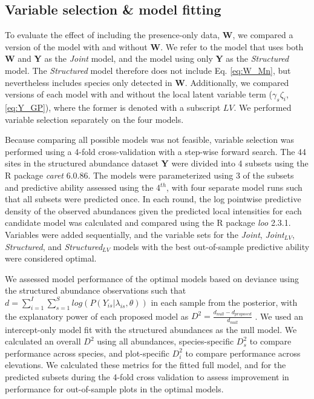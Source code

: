 \documentclass[preprint,review,times,12pt]{elsarticle}
\begin{document}
\subsection{Variable selection \& model fitting}
To evaluate the effect of including the presence-only data, \textbf{W}, we compared a version of the model with and without \textbf{W}. We refer to the model that uses both \textbf{W} and \textbf{Y} as the \emph{Joint} model, and the model using only \textbf{Y} as the \emph{Structured} model. The \emph{Structured} model therefore does not include Eq. \ref{eq:W_Mn}, but nevertheless includes species only detected in \textbf{W}. Additionally, we compared versions of each model with and without the local latent variable term ($\gamma_s \zeta_i$, \ref{eq:Y_GP}), where the former is denoted with a subscript $LV$. We performed variable selection separately on the four models.

Because comparing all possible models was not feasible, variable selection was performed using a 4-fold cross-validation with a step-wise forward search. The 44 sites in the structured abundance dataset \textbf{Y} were divided into 4 subsets using the R package \emph{caret} 6.0.86. The models were parameterized using 3 of the subsets and predictive ability assessed using the 4$^{th}$, with four separate model runs such that all subsets were predicted once. In each round, the log pointwise predictive density of the observed abundances given the predicted local intensities for each candidate model was calculated and compared using the R package \emph{loo} 2.3.1. Variables were added sequentially, and the variable sets for the \emph{Joint}, \emph{Joint}$_{LV}$, \emph{Structured}, and \emph{Structured}$_{LV}$ models with the best out-of-sample predictive ability were considered optimal.

We assessed model performance of the optimal models based on deviance using the structured abundance observations such that $d = \sum_{i=1}^{I}\sum_{s=1}^S log(P(Y_{is} | \lambda_{is}, \theta))$ in each sample from the posterior, with the explanatory power of each proposed model as $D^2 = \frac{d_{null} - d_{proposed}}{d_{null}}$ \citep{Guisan2000,Caradima2019}. We used an intercept-only model fit with the structured abundances as the null model. We calculated an overall $D^2$ using all abundances, species-specific $D^2_s$ to compare performance across species, and plot-specific $D^2_i$ to compare performance across elevations. We calculated these metrics for the fitted full model, and for the predicted subsets during the 4-fold cross validation to assess improvement in performance for out-of-sample plots in the optimal models.
\end{document}
